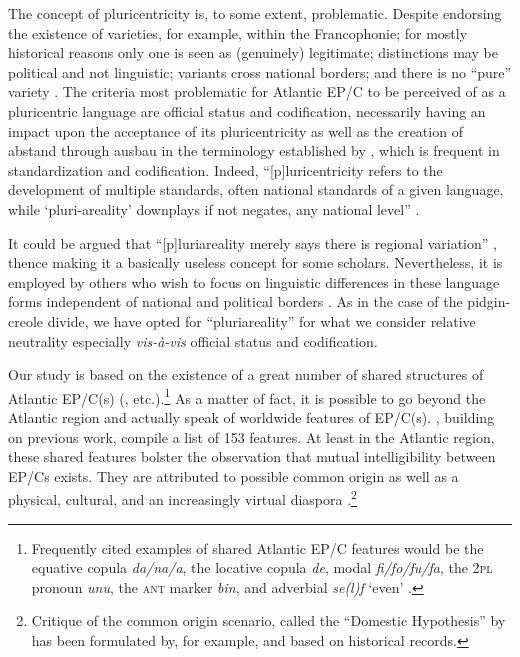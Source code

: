 \documentclass[output=paper,colorlinks,citecolor=brown]{langscibook}
\begin{document}
The concept of pluricentricity is, to some extent, problematic. Despite endorsing the existence of varieties, for example, within the Francophonie; for mostly historical reasons only one is seen as (genuinely) legitimate; distinctions may be political and not linguistic; variants cross national borders; and there is no “pure” variety \citep[cf.][383]{Vigouroux2013}. The criteria most problematic for Atlantic EP/C to be perceived of as a pluricentric language are official status and codification, necessarily having an impact upon the acceptance of its pluricentricity as well as the creation of abstand through ausbau in the terminology established by \citet{Kloss_1967}, which is frequent in standardization and codification. Indeed, “[p]luricentricity refers to the development of multiple standards, often national standards of a given language, while ‘pluri-areality’ downplays if not negates, any national level” \citep[7]{Dollinger_2019}. 

It could be argued that “[p]luriareality merely says there is regional variation” \citep[7]{Dollinger_2019}, thence making it a basically useless concept for some scholars. Nevertheless, it is employed by others who wish to focus on linguistic differences in these language forms independent of national and political borders \citep{Niehaus_2015,ElspaB_Durscheid_Ziegler_2017}. As in the case of the pidgin-creole divide, we have opted for “pluriareality” for what we consider relative neutrality especially \emph{vis-à-vis} official status and codification.  

Our study is based on the existence of a great number of shared structures of Atlantic EP/C(s) (\cite{Alleyne_1980,Holm_1988_1989,Holm_Patrick_2007,Michaelis_Maurer_Haspelmath_Huber_2013,Muhleisen_2018}, etc.).\footnote{Frequently cited examples of shared Atlantic EP/C features would be the equative copula \emph{da/na/a}, the locative copula \emph{de}, modal \emph{fi/fo/fu/fa}, the 2\textsc{pl} pronoun \emph{unu}, the \textsc{ant} marker \emph{bin}, and adverbial \emph{se(l)f} `even’ \citep{McWhorter_1995}.} As a matter of fact, it is possible to go beyond the Atlantic region and actually speak of worldwide features of EP/C(s). \citet{Faraclas_Corum_Arrindell_etal_2019}, building on previous work, compile a list of 153 features. At least in the Atlantic region, these shared features bolster the observation that mutual intelligibility between EP/Cs exists. They are attributed to possible common origin as well as a physical, cultural, and an increasingly virtual diaspora \citep[cf.][]{Hancock_1986,Mair_Muhleisen_Pierker_2015,McWhorter_1996}.\footnote{Critique of the common origin scenario, called the “Domestic Hypothesis” by \citet{Hancock_1986} has been formulated by, for example, \citet{Baker_1999} and \citet{Huber_1999a} based on historical records.} 
\end{document}
